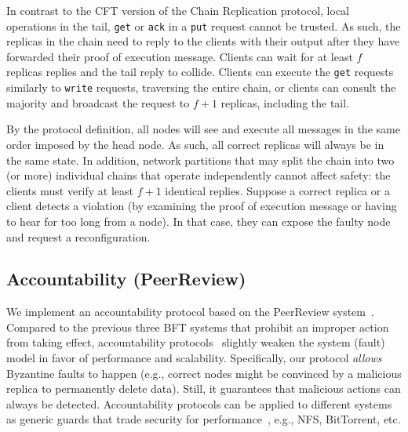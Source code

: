 In contrast to the CFT version of the Chain Replication protocol, local operations in the tail, {\tt get} or {\tt ack} in a {\tt put} request cannot be trusted. As such, the replicas in the chain need to reply to the clients with their output after they have forwarded their proof of execution message. Clients can wait for at least $f$ replicas replies and the tail reply to collide. Clients can execute the {\tt get} requests similarly to {\tt write} requests, traversing the entire chain, or clients can consult the majority and broadcast the request to $f+1$ replicas, including the tail. 


 By the protocol definition, all nodes will see and execute all messages in the same order imposed by the head node. As such, all correct replicas will always be in the same state. In addition, network partitions that may split the chain into two (or more) individual chains that operate independently cannot affect safety: the clients must verify at least $f+1$ identical replies. Suppose a correct replica or a client detects a violation (by examining the proof of execution message or having to hear for too long from a node). In that case, they can expose the faulty node and request a reconfiguration.

\noindent{}




\subsection{Accountability (PeerReview)}
\label{sec:use_cases::accountability}





We implement an accountability protocol based on the PeerReview system~\cite{bftdetection, peer-review}. Compared to the previous three BFT systems that prohibit an improper action from taking effect, accountability protocols~\cite{268272, bftdetection, peer-review} slightly weaken the system (fault) model in favor of performance and scalability. Specifically, our protocol {\em allows} Byzantine faults to happen (e.g., correct nodes might be convinced by a malicious replica to permanently delete data). Still, it guarantees that malicious actions can always be detected. Accountability protocols can be applied to different systems as generic guards that trade security for performance~\cite{peer-review}, e.g., NFS, BitTorrent, etc. 

